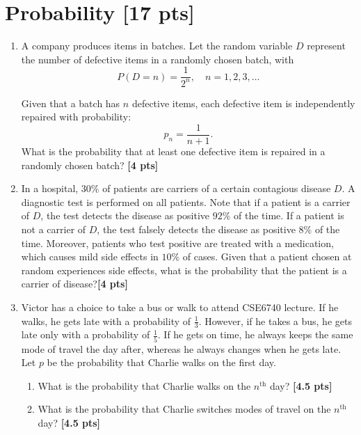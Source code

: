 \documentclass[11pt,epic]{article}
\begin{document}
\section{Probability [17 pts]}
\begin{enumerate}
\item A company produces items in batches. Let the random variable \(D\) represent the number of defective items in a randomly chosen batch, with  
\[
P(D = n) = \frac{1}{2^n}, \quad n = 1, 2, 3, \dots
\]

Given that a batch has \(n\) defective items, each defective item is independently repaired with probability:
\[
p_n = \frac{1}{n+1}.
\]
 What is the probability that at least one defective item is repaired in a randomly chosen batch? \textbf{[4 pts]}

\item In a hospital, $30\%$ of patients are carriers of a certain contagious disease $D$. A diagnostic test is performed on all patients. Note that if a patient is a carrier of $D$, the test detects the disease as positive $92\%$ of the time. If a patient is not a carrier of $D$, the test falsely detects the disease as positive $8\%$ of the time. Moreover, patients who test positive are treated with a medication, which causes mild side effects in $10\%$ of cases. Given that a patient chosen at random experiences side effects, what is the probability that the patient is a carrier of disease?\textbf{[4 pts]}

\item Victor has a choice to take a bus or walk to attend CSE6740 lecture. If he walks, he gets late with a probability of $\frac{1}{3}$. However, if he takes a bus, he gets late only with a probability of $\frac{1}{5}$. If he gets on time, he always keeps the same mode of travel the day after, whereas he always changes when he gets late. Let $p$ be the probability that Charlie walks on the first day.
\begin{enumerate}
\item What is the probability that Charlie walks on the $n^{\text {th}}$ day? \textbf{[4.5 pts]}
\item What is the probability that Charlie switches modes of travel on the $n^{\text {th }}$ day? \textbf{[4.5 pts]}
\end{enumerate}

\end{enumerate}
\end{document}

